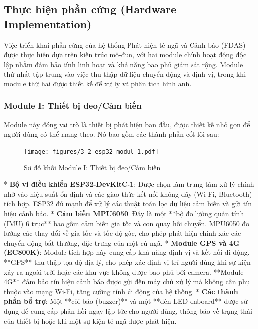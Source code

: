 \subsection{Thực hiện phần cứng (Hardware Implementation)}
\label{sec:hardware_implementation}

Việc triển khai phần cứng của hệ thống Phát hiện té ngã và Cảnh báo (FDAS) được thực hiện dựa trên kiến trúc mô-đun, với hai module chính hoạt động độc lập nhằm đảm bảo tính linh hoạt và khả năng bao phủ giám sát rộng. Module thứ nhất tập trung vào việc thu thập dữ liệu chuyển động và định vị, trong khi module thứ hai được thiết kế để xử lý và phân tích hình ảnh.

\subsubsection{Module I: Thiết bị đeo\slash Cảm biến}
\label{ssec:module_one}

Module này đóng vai trò là thiết bị phát hiện ban đầu, được thiết kế nhỏ gọn để người dùng có thể mang theo. Nó bao gồm các thành phần cốt lõi sau:

\begin{figure}[H]
    \centering
    \texttt{[image: figures/3\_2\_esp32\_modul\_1.pdf]}
    \caption{Sơ đồ khối Module I: Thiết bị đeo\slash Cảm biến}
    \label{fig:module1_block_diagram}
\end{figure}

* \textbf{Bộ vi điều khiển ESP32-DevKitC-1}: Được chọn làm trung tâm xử lý chính nhờ vào hiệu suất ổn định và các giao thức kết nối không dây (Wi-Fi, Bluetooth) tích hợp. ESP32 đủ mạnh để xử lý các thuật toán lọc dữ liệu cảm biến và gửi tín hiệu cảnh báo.
* \textbf{Cảm biến MPU6050}: Đây là một **bộ đo lường quán tính (IMU) 6 trục** bao gồm cảm biến gia tốc và con quay hồi chuyển. MPU6050 đo lường các thay đổi về gia tốc và tốc độ góc, cho phép phát hiện chính xác các chuyển động bất thường, đặc trưng của một cú ngã.
* \textbf{Module GPS và 4G (EC800K)}: Module tích hợp này cung cấp khả năng định vị và kết nối di động. **GPS** thu thập tọa độ địa lý, cho phép xác định vị trí người dùng khi sự kiện xảy ra ngoài trời hoặc các khu vực không được bao phủ bởi camera. **Module 4G** đảm bảo tín hiệu cảnh báo được gửi đến máy chủ xử lý mà không cần phụ thuộc vào mạng Wi-Fi, tăng cường tính di động của hệ thống.
* \textbf{Các thành phần bổ trợ}: Một **còi báo (buzzer)** và một **đèn LED onboard** được sử dụng để cung cấp phản hồi ngay lập tức cho người dùng, thông báo về trạng thái của thiết bị hoặc khi một sự kiện té ngã được phát hiện.

